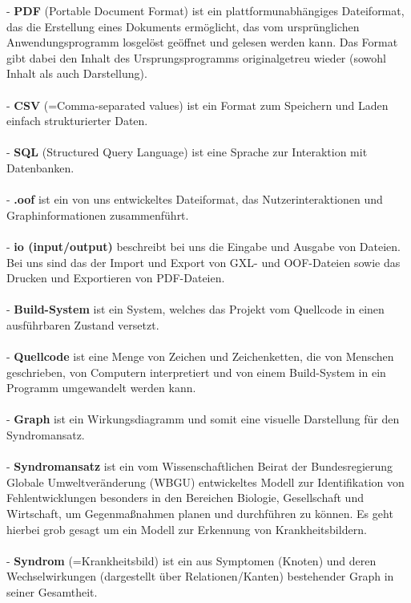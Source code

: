 \documentclass[enabledeprecatedfontcommands,fontsize=11pt,paper=a4,twoside]{scrartcl}
\newcounter{one}
\begin{document}
- \textbf{PDF} (Portable Document Format) ist ein plattformunabhängiges Dateiformat, das die Erstellung eines Dokuments ermöglicht, das vom ursprünglichen Anwendungsprogramm losgelöst geöffnet und gelesen werden kann. Das Format gibt dabei den Inhalt des Ursprungsprogramms originalgetreu wieder (sowohl Inhalt als auch Darstellung). \\ \\
- \textbf{CSV} (=Comma-separated values) ist ein Format zum Speichern und Laden einfach strukturierter Daten.\\ \\
- \textbf{SQL} (Structured Query Language) ist eine Sprache zur Interaktion mit Datenbanken. \\ \\
- \textbf{.oof} ist ein von uns entwickeltes Dateiformat, das Nutzerinteraktionen und Graphinformationen zusammenführt. \\ \\
- \textbf{io (input/output)} beschreibt bei uns die Eingabe und Ausgabe von Dateien. Bei uns sind das der Import und Export von GXL- und OOF-Dateien sowie das Drucken und Exportieren von PDF-Dateien. \\ \\
- \textbf{Build-System} ist ein System, welches das Projekt vom Quellcode in einen ausführbaren Zustand versetzt. \\ \\
- \textbf{Quellcode} ist eine Menge von Zeichen und Zeichenketten, die von Menschen geschrieben, von Computern interpretiert und von einem Build-System in ein Programm umgewandelt werden kann.  \\ \\
- \textbf{Graph} ist ein Wirkungsdiagramm und somit eine visuelle Darstellung für den Syndromansatz.  \\ \\
- \textbf{\hypertarget{Syndromansatz}{Syndromansatz}} ist ein vom \glqq Wissenschaftlichen Beirat der Bundesregierung Globale Umweltveränderung \grqq{} (WBGU) entwickeltes Modell zur Identifikation von Fehlentwicklungen besonders in den Bereichen Biologie, Gesellschaft und Wirtschaft, um Gegenmaßnahmen planen und durchführen zu können. Es geht hierbei grob gesagt um ein Modell zur Erkennung von \glqq Krankheitsbildern\grqq. \\ \\
- \textbf{Syndrom} (=Krankheitsbild) ist ein aus Symptomen (Knoten) und deren Wechselwirkungen (dargestellt über Relationen/Kanten) bestehender Graph in seiner Gesamtheit. \\ \\
\end{document}
